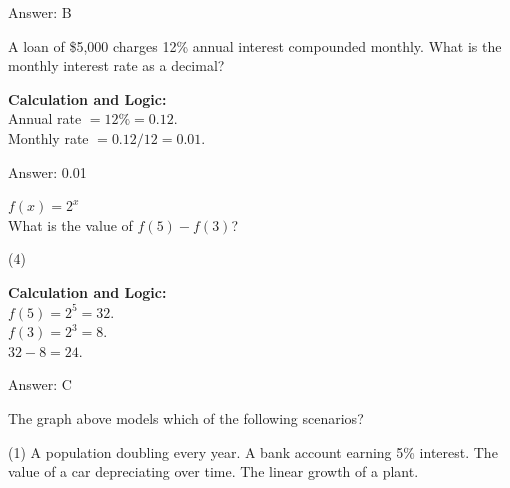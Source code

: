 \documentclass[11pt,paper=a4,answers]{exam}
\begin{document}
\begin{questions}
\begin{solution}
Answer: \colorbox{yellow!100}{B}
\end{solution}

\vspace{40pt}

\question
A loan of \$5,000 charges 12\% annual interest compounded monthly. What is the monthly interest rate as a decimal?

\begin{solution}
\textbf{Calculation and Logic:} \\
Annual rate $= 12\% = 0.12$. \\
Monthly rate $= 0.12 / 12 = 0.01$.

\vspace{25pt}

Answer: \colorbox{yellow!100}{0.01}
\end{solution}

\vspace{40pt}

\question
$f(x) = 2^x$ \\
What is the value of $f(5) - f(3)$?
\begin{tasks}(4)
\end{tasks}

\begin{solution}
\textbf{Calculation and Logic:} \\
$f(5) = 2^5 = 32$. \\
$f(3) = 2^3 = 8$. \\
$32 - 8 = 24$.

\vspace{25pt}

Answer: \colorbox{yellow!100}{C}
\end{solution}

\vspace{40pt}

\question

The graph above models which of the following scenarios?
\begin{tasks}(1)
    \task A population doubling every year.
    \task A bank account earning 5\% interest.
    \task The value of a car depreciating over time.
    \task The linear growth of a plant.
\end{tasks}


\end{questions}
\end{document}
